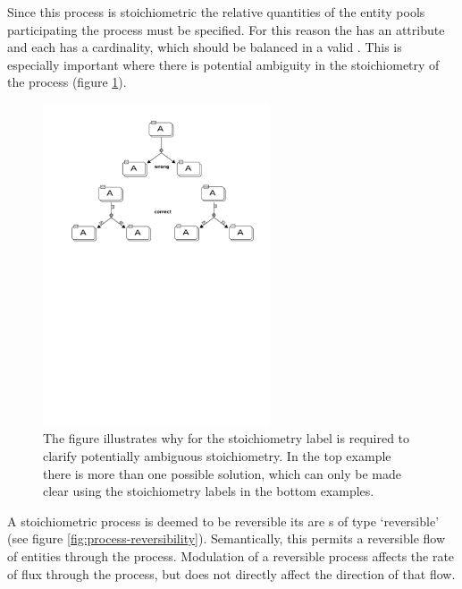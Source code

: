 Since this process is stoichiometric the relative quantities of the
entity pools participating the process must be specified. For this
reason the  has an  attribute
and each  has a cardinality, which should be
balanced in a valid \PDm. This is especially important where there is
potential ambiguity in the stoichiometry of the process (figure \ref{fig:prod-card}).



\begin{figure}[htb]
  \centering
  \includegraphics[width=0.6\textwidth]{examples/stoichEx1}
  \caption{The figure illustrates why for the stoichiometry label is
    required to clarify potentially ambiguous stoichiometry. In the
    top example there is more than one possible solution, which can
    only be made clear using the stoichiometry labels in the bottom examples.}
  \label{fig:prod-card}
\end{figure}



\label{sec: semantics reversible procs}

A stoichiometric process is deemed to be reversible its
 are s of type `reversible' (see
figure \ref{fig:process-reversibility}).  Semantically, this permits a
reversible flow of entities through the process.  Modulation of a
reversible process affects the rate of flux through the process, but
does not directly affect the direction of that flow.

